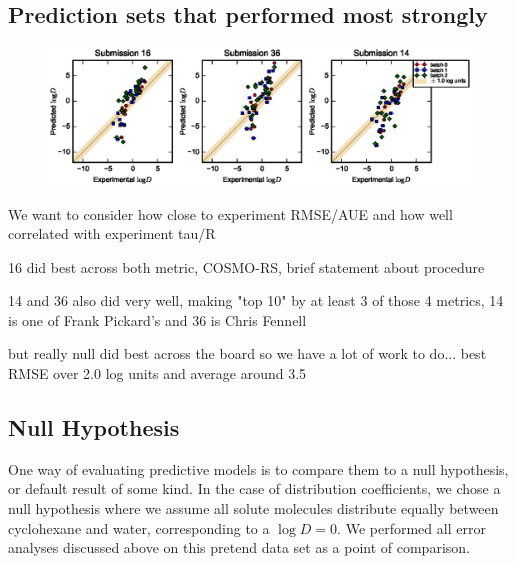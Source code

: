
\subsection{Prediction sets that performed most strongly}
\label{results:2}
\begin{figure} %
\includegraphics{BestGroups.eps}
\caption{}
\label{BestGroups}       %
\end{figure}
We want to consider how close to experiment RMSE/AUE and how well correlated with experiment tau/R

16 did best across both metric, COSMO-RS, brief statement about procedure

14 and 36 also did very well, making "top 10" by at least 3 of those 4 metrics, 14 is one of Frank Pickard's and 36 is Chris Fennell

but really null did best across the board so we have a lot of work to do... best RMSE over 2.0 log units and average around 3.5

\subsection{Null Hypothesis}
\label{results:3}
One way of evaluating predictive models is to compare them to a null hypothesis, or default result of some kind. 
In the case of distribution coefficients, we chose a null hypothesis where we assume all solute molecules distribute equally between cyclohexane and water, corresponding to a $\log D = 0$. 
We performed all error analyses discussed above on this pretend data set as a point of comparison. 


